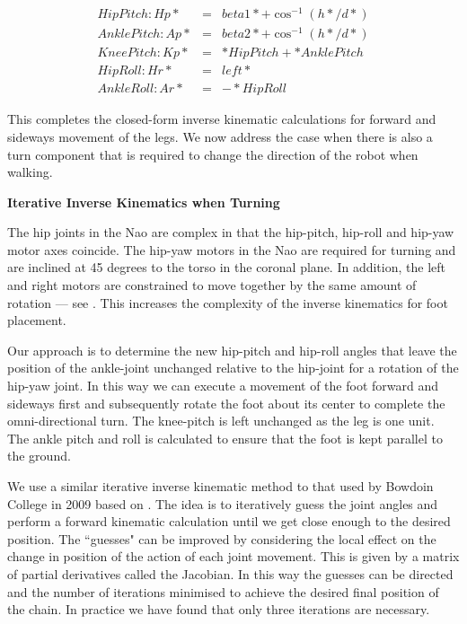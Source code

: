 \documentclass[pdftex,11pt,a4paper]{report}
\begin{document}
\begin{eqnarray}
HipPitch:Hp{*} &=& beta1{*} + \cos^{-1}(h{*}/d{*})\\
AnklePitch:Ap{*} &=& beta2{*} + \cos^{-1}(h{*}/d{*})\\
KneePitch:Kp{*} &=& {*}HipPitch + {*}AnklePitch\\
HipRoll:Hr{*} &=& left{*}\\
AnkleRoll:Ar{*} &=& -{*}HipRoll
\end{eqnarray}

This completes the closed-form inverse kinematic calculations for forward and sideways movement of the legs. We now address the case when there is also a turn component that is required to change the direction of the robot when walking. 

\textbf{Iterative Inverse Kinematics when Turning}

The hip joints in the Nao are complex in that the hip-pitch, hip-roll and hip-yaw motor axes coincide. The hip-yaw motors in the Nao are required for turning and are inclined at 45 degrees to the torso in the coronal plane. In addition, the left and right motors are constrained to move together by the same amount of rotation --- see \cite{aldebaran10developer}. This increases the complexity of the inverse kinematics for foot placement. 

Our approach is to determine the new hip-pitch and hip-roll angles that leave the position of the ankle-joint unchanged relative to the hip-joint for a rotation of the hip-yaw joint. In this way we can execute a movement of the foot forward and sideways first and subsequently rotate the foot about its center to complete the omni-directional turn. The knee-pitch is left unchanged as the leg is one unit. The ankle pitch and roll is calculated to ensure that the foot is kept parallel to the ground. 

We use a similar iterative inverse kinematic method to that used by Bowdoin College in 2009 based on \cite{Buss04introductionto}. The idea is to iteratively guess the joint angles and perform a forward kinematic calculation until we get close enough to the desired position. The ``guesses" can be improved by considering the local effect on the change in position of the action of each joint movement. This is given by a matrix of partial derivatives called the Jacobian. In this way the guesses can be directed and the number of iterations minimised to achieve the desired final position of the chain. In practice we have found that only three iterations are necessary. 
\end{document}
